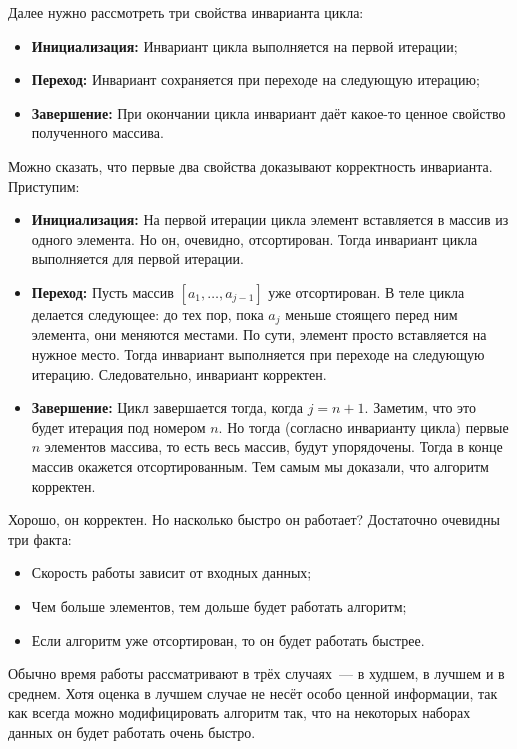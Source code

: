 Далее нужно рассмотреть три свойства инварианта цикла:
\begin{itemize}
	\item \textbf{Инициализация:} Инвариант цикла выполняется на первой итерации;
	
	\item \textbf{Переход:} Инвариант сохраняется при переходе на следующую итерацию;
	
	\item \textbf{Завершение:} При окончании цикла инвариант даёт какое-то ценное свойство полученного массива.
\end{itemize}
Можно сказать, что первые два свойства доказывают корректность инварианта. Приступим:
\begin{itemize}
	\item \textbf{Инициализация:} На первой итерации цикла элемент вставляется в массив из одного элемента. Но он, очевидно, отсортирован. Тогда инвариант цикла выполняется для первой итерации.
	
	\item \textbf{Переход:} Пусть массив \([a_1, \ldots, a_{j - 1}]\) уже отсортирован. В теле цикла делается следующее: до тех пор, пока \(a_{j}\) меньше стоящего перед ним элемента, они меняются местами. По сути, элемент просто вставляется на нужное место. Тогда инвариант выполняется при переходе на следующую итерацию. Следовательно, инвариант корректен.
	
	\item \textbf{Завершение:} Цикл завершается тогда, когда \(j = n + 1\). Заметим, что это будет итерация под номером \(n\). Но тогда (согласно инварианту цикла) первые \(n\) элементов массива, то есть весь массив, будут упорядочены. Тогда в конце массив окажется отсортированным. Тем самым мы доказали, что алгоритм корректен.
\end{itemize}

Хорошо, он корректен. Но насколько быстро он работает? Достаточно очевидны три факта:
\begin{itemize}
	\item Скорость работы зависит от входных данных;
	\item Чем больше элементов, тем дольше будет работать алгоритм;
	\item Если алгоритм уже отсортирован, то он будет работать быстрее.
\end{itemize}
Обычно время работы рассматривают в трёх случаях~--- в худшем, в лучшем и в среднем. Хотя оценка в лучшем случае не несёт особо ценной информации, так как всегда можно модифицировать алгоритм так, что на некоторых наборах данных он будет работать очень быстро.


